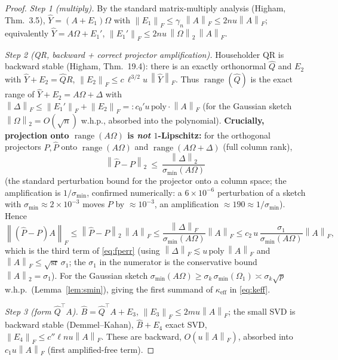 \documentclass{amsart}
\theoremstyle{definition}
\DeclareMathOperator{\range}{range}
\newcommand{\Frob}[1]{\left\lVert #1\right\rVert_F}
\newcommand{\Op}[1]{\left\lVert #1\right\rVert_2}
\begin{document}
\begin{proof}
\emph{Step 1 (multiply).} By the standard matrix-multiply analysis (Higham,
Thm.~3.5), $\widehat Y=(A+E_1)\Omega$ with $\Frob{E_1}\le\gamma_n\Frob A\le
2nu\Frob A$; equivalently $\widehat Y=A\Omega+E_1'$,
$\Frob{E_1'}\le2nu\,\Op\Omega\,\Frob A$.

\emph{Step 2 (QR, backward + correct projector amplification).} Householder QR is
backward stable (Higham, Thm.~19.4): there is an exactly orthonormal
$\widehat Q$ and $E_2$ with $\widehat Y+E_2=\widehat Q R$,
$\Frob{E_2}\le c\,\ell^{3/2}u\,\Frob{\widehat Y}$. Thus $\range(\widehat Q)$ is
the exact range of $\widehat Y+E_2=A\Omega+\Delta$ with
$\Frob\Delta\le\Frob{E_1'}+\Frob{E_2}=:c_0'u\,\mathrm{poly}\cdot\Frob A$ (for the
Gaussian sketch $\Op\Omega=O(\sqrt n)$ w.h.p., absorbed into the polynomial).
\textbf{Crucially, projection onto $\range(A\Omega)$ is \emph{not}
$1$-Lipschitz:} for the orthogonal projectors $P,\widehat P$ onto
$\range(A\Omega)$ and $\range(A\Omega+\Delta)$ (full column rank),
\begin{equation}\label{eq:projpert}
\Op{\widehat P-P}\ \le\ \frac{\Op\Delta}{\sigma_{\min}(A\Omega)}
\end{equation}
(the standard perturbation bound for the projector onto a column space; the
amplification is $1/\sigma_{\min}$, confirmed numerically: a $6\times10^{-6}$
perturbation of a sketch with $\sigma_{\min}\approx2\times10^{-3}$ moves $P$ by
$\approx10^{-3}$, an amplification $\approx190\approx1/\sigma_{\min}$). Hence
\[
\Frob{(\widehat P-P)A}\le\Op{\widehat P-P}\,\Frob A
\le\frac{\Frob\Delta}{\sigma_{\min}(A\Omega)}\Frob A
\le c_2\,u\,\frac{\sigma_1}{\sigma_{\min}(A\Omega)}\Frob A ,
\]
which is the third term of \eqref{eq:fperr} (using $\Frob\Delta\lesssim u\,\mathrm{poly}\,\Frob A$
and $\Frob A\le\sqrt{\mathrm{sr}}\,\sigma_1$; the $\sigma_1$ in the numerator is
the conservative bound $\Op A=\sigma_1$). For the Gaussian sketch
$\sigma_{\min}(A\Omega)\ge\sigma_k\,\sigma_{\min}(\Omega_1)\asymp\sigma_k\sqrt p$
w.h.p.\ (Lemma~\ref{lem:smin}), giving the first summand of
$\kappa_{\mathrm{eff}}$ in \eqref{eq:keff}.

\emph{Step 3 (form $\widehat Q^\top A$).}
$\widehat B=\widehat Q^\top A+E_3$, $\Frob{E_3}\le2mu\Frob A$; the small SVD is
backward stable (Demmel--Kahan), $\widehat B+E_4$ exact SVD,
$\Frob{E_4}\le c''\ell n u\Frob A$. These are backward, $O(u\Frob A)$, absorbed
into $c_1u\Frob A$ (first amplified-free term).


\end{proof}
\end{document}
